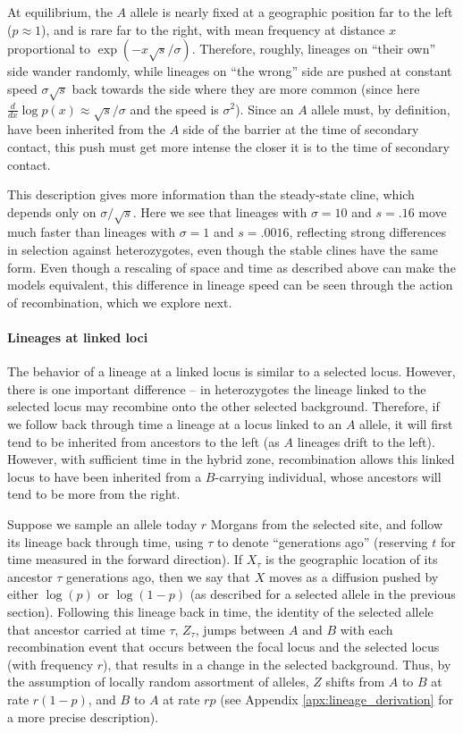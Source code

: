 \documentclass[11pt,letterpaper]{article}
\newcommand{\alisa}[1]{{\em \color{red} #1}}
\begin{document}
At equilibrium, the $A$ allele is nearly fixed at a geographic position far to the left ($p \approx 1$),
and is rare far to the right, with mean frequency at distance $x$ proportional to $\exp(-x\sqrt{s}/\sigma)$.
Therefore, roughly, lineages on ``their own'' side wander randomly,
while lineages on ``the wrong'' side are pushed at constant speed $\sigma\sqrt{s}$ 
back towards the side where they are more common
(since here $\frac{d}{dx}\log p(x) \approx \sqrt{s}/\sigma$ and the speed is $\sigma^2$). 
Since an $A$ allele must, by definition, have been inherited from the $A$ side of the barrier 
at the time of secondary contact, this push must get more intense the closer it is to the time of secondary contact.

This description gives more information than the steady-state cline,
which depends only on $\sigma/\sqrt{s}$.
Here we see that lineages with $\sigma=10$ and $s=.16$ move much faster
than lineages with $\sigma=1$ and $s=.0016$,
reflecting strong differences in selection against heterozygotes,
even though the stable clines have the same form.
Even though a rescaling of space and time as described above can make the models equivalent,
this difference in lineage speed can be seen through the action of recombination, which we explore next.

\paragraph{Lineages at linked loci}
The behavior of a lineage at a linked locus is similar to a selected locus. 
However, there is one important difference -- 
in heterozygotes the lineage linked to the selected locus may
recombine onto the other selected background.
Therefore, if we follow back through time a lineage at a locus linked to an $A$ allele, 
it will first tend to be inherited from ancestors to the left (as $A$ lineages drift to the left). 
However, with sufficient time in the hybrid zone, recombination allows this linked locus 
to have been inherited from a $B$-carrying individual,
whose ancestors will tend to be more from the right.

Suppose we sample an allele today $r$ Morgans from the selected site, and  
follow its lineage back through time, using $\tau$ to denote ``generations ago''
(reserving $t$ for time measured in the forward direction).
If $X_\tau$ is the geographic location of its ancestor $\tau$ generations ago,
then we say that $X$ moves as a diffusion pushed by either $\log(p)$ or $\log(1-p)$ 
(as described for a selected allele in the previous section).
Following this lineage back in time, the identity of the selected allele that ancestor carried at time $\tau$, $Z_\tau$, 
jumps between $A$ and $B$ with each recombination event that occurs between the focal locus and the selected locus (with frequency $r$), 
that results in a change in the  selected background.    
Thus, by the assumption of locally random assortment of alleles, $Z$ shifts from $A$ to $B$  at rate $r (1-p)$, and $B$ to $A$ at rate $r p$ 
(see Appendix \ref{apx:lineage_derivation} for a more precise description).
\end{document}
